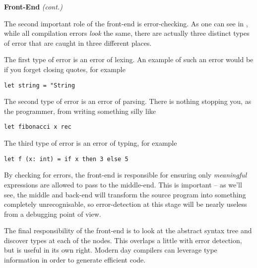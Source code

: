 \begin{minipage}[t]{0.15\textwidth}
\textbf{\sffamily Front-End} \textit{\sffamily (cont.)}    
\end{minipage}%
\begin{minipage}[t]{0.85\textwidth}
    \setlength{\parskip}{.5\baselineskip}
    The second important role of the front-end is error-checking. As one can see in , while all compilation errors \emph{look} the same, there are actually three distinct types of error that are caught in three different places. 

    The first type of error is an error of lexing. An example of such an error would be if you forget closing quotes, for example
\begin{verbatim}
let string = "String
\end{verbatim}
    The second type of error is an error of parsing. There is nothing stopping you, as the programmer, from writing something silly like 
\begin{verbatim}
let fibonacci x rec
\end{verbatim}    
    The third type of error is an error of typing, for example
\begin{verbatim}
let f (x: int) = if x then 3 else 5
\end{verbatim}
    By checking for errors, the front-end is responsible for ensuring only \emph{meaningful} expressions are allowed to pass to the middle-end. This is important -- as we'll see, the middle and back-end will transform the source program into something completely unrecognisable, so error-detection at this stage will be nearly useless from a debugging point of view.

    The final responsibility of the front-end is to look at the abstract syntax tree and discover types at each of the nodes. This overlaps a little with error detection, but is useful in its own right. Modern day compilers can leverage type information in order to generate efficient code. \strut
\end{minipage}

